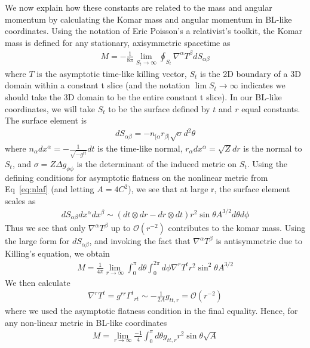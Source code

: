 \documentclass[aps,prd,amsmath,showpacs,amssymb,superscriptaddress,nofootinbib,longbibliography,eqsecnum,preprintnumbers]{revtex4-1}
\begin{document}
We now explain how these constants are related to the mass and angular momentum by calculating the Komar mass and angular momentum in BL-like coordinates.
Using the notation of Eric Poisson's a relativist's toolkit, the Komar mass is defined for any stationary, axisymmetric spacetime as 
\begin{align}
M =-\frac{1}{8\pi} \lim_{S_{t}\to \infty} \oint_{S_t}\nabla^\alpha T^\beta dS_{\alpha\beta}
\end{align}
where $T$ is the asymptotic time-like killing vector, $S_{t}$ is the 2D boundary of a 3D domain within a constant t slice (and the notation $\lim S_{t}\to \infty$ indicates we should take the 3D domain to be the entire constant t slice). In our BL-like coordinates, we will take $S_{t}$ to be the surface defined by $t$ and $r$ equal constants. The surface element is
\begin{align}
dS_{\alpha \beta} =-n_{[\alpha}r_{\beta]}\sqrt{\sigma}d^2\theta
\end{align}
where $n_{\alpha}dx^\alpha=-\frac{1}{\sqrt{-g^{tt}}}dt$ is the time-like normal, $r_{\alpha}dx^\alpha=\sqrt{Z}dr$ is the normal to $S_{t}$, and $\sigma=Z\Delta g_{\phi\phi}$ is the determinant of the induced metric on $S_{t}$.
Using the defining conditions for asymptotic flatness on the nonlinear metric from Eq~\eqref{eq:nlaf} (and letting $A=4C^2$), we see that at large r, the surface element scales as 
\begin{align}
dS_{\alpha\beta}dx^\alpha dx^\beta \sim (dt \otimes dr -dr \otimes dt)r^2\sin\theta A^{3/2}d\theta d\phi
\end{align}
Thus we see that only $\nabla^\alpha T^\beta$ up to $\mathcal{O}(r^{-2})$ contributes to the komar mass. Using the large form for $dS_{\alpha \beta}$, and invoking the fact that $\nabla^\alpha T^\beta$ is antisymmetric due to Killing's equation, we obtain
\begin{align}
M =\frac{1}{4\pi}\lim _{r\to \infty}\int_{0}^\pi d\theta \int_{0}^{2\pi}d\phi \nabla^rT^t r^2\sin^2\theta A^{3/2}
\end{align}
We then calculate
\begin{align}
\nabla^r T^t =g^{rr} \Gamma^t {}_{rt} \sim -\frac{1}{2A}g_{tt,r} =\mathcal{O}(r^{-2})
\end{align}
where we used the asymptotic flatness condition in the final equality. Hence, for any non-linear metric in BL-like coordinates
\begin{align}
M=\lim_{r\to \infty} \frac{-1}{4}\int_{0}^\pi d\theta g_{tt,r}r^2 \sin\theta\sqrt{A}
\end{align}
\end{document}
